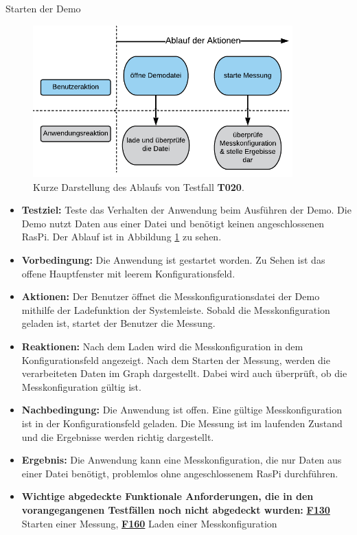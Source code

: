 \documentclass[parskip=full]{scrartcl}
\begin{document}
\begin{description}
\begin{itemize}
\end{itemize}


\hypertarget{link-t020}{\item[T020]} Starten der Demo 

\begin{figure}[htbp]
	\begin{center}
		\includegraphics[width = 10cm]{Grafik/T020-Ablauf.png}
		\caption{Kurze Darstellung des Ablaufs von Testfall \textbf{T020}.}
		\label{T020-Ablauf}
	\end{center}
\end{figure}
\begin{itemize}

\item []\textbf{Testziel:} Teste das Verhalten der Anwendung beim Ausführen der Demo. Die Demo nutzt Daten aus einer Datei und benötigt keinen angeschlossenen \gls{RasPi}. Der Ablauf ist in Abbildung \ref{T020-Ablauf} zu sehen.

\item []\textbf{Vorbedingung:} Die Anwendung ist gestartet worden. Zu Sehen ist das offene Hauptfenster mit leerem Konfigurationsfeld.
\item []\textbf{Aktionen:} Der Benutzer öffnet die Messkonfigurationsdatei der Demo mithilfe der Ladefunktion der Systemleiste. Sobald die Messkonfiguration geladen ist, startet der Benutzer die Messung.
\item []\textbf{Reaktionen:} Nach dem Laden wird die Messkonfiguration in dem Konfigurationsfeld angezeigt. Nach dem Starten der Messung, werden die verarbeiteten Daten im Graph dargestellt. Dabei wird auch überprüft, ob die Messkonfiguration gültig ist.
\item []\textbf{Nachbedingung:} Die Anwendung ist offen. Eine gültige Messkonfiguration ist in der Konfigurationsfeld geladen. Die Messung ist im laufenden Zustand und die Ergebnisse werden richtig dargestellt.

\item []\textbf{Ergebnis:} Die Anwendung kann eine Messkonfiguration, die nur Daten aus einer Datei benötigt, problemlos ohne angeschlossenem \gls{RasPi} durchführen. 
\item []\textbf{Wichtige abgedeckte Funktionale Anforderungen, die in den vorangegangenen Testfällen noch nicht abgedeckt wurden:} \hyperlink{link-f130}{\textbf{F130}} Starten einer Messung, \hyperlink{link-f160}{\textbf{F160}} Laden einer Messkonfiguration


\end{itemize}
\end{description}
\end{document}

